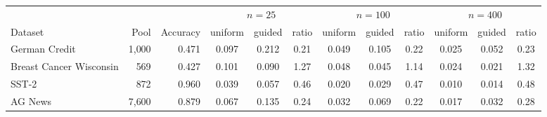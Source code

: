 \begin{tabular}{lrrccccccccc}
\toprule
 & & & \multicolumn{3}{c}{$n = 25$} & \multicolumn{3}{c}{$n = 100$} & \multicolumn{3}{c}{$n = 400$} \\
\cmidrule(lr){4-6}\cmidrule(lr){7-9}\cmidrule(lr){10-12}
Dataset & Pool & Accuracy & uniform & guided & ratio & uniform & guided & ratio & uniform & guided & ratio \\
\midrule
German Credit & 1{,}000 & 0.471 & 0.097 & 0.212 & 0.21 & 0.049 & 0.105 & 0.22 & 0.025 & 0.052 & 0.23 \\
Breast Cancer Wisconsin & 569 & 0.427 & 0.101 & 0.090 & 1.27 & 0.048 & 0.045 & 1.14 & 0.024 & 0.021 & 1.32 \\
SST-2 & 872 & 0.960 & 0.039 & 0.057 & 0.46 & 0.020 & 0.029 & 0.47 & 0.010 & 0.014 & 0.48 \\
AG News & 7{,}600 & 0.879 & 0.067 & 0.135 & 0.24 & 0.032 & 0.069 & 0.22 & 0.017 & 0.032 & 0.28 \\
\bottomrule
\end{tabular}
